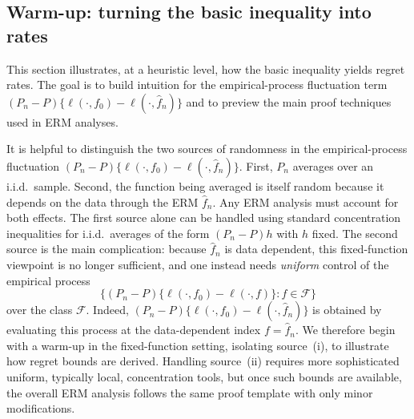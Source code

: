 \documentclass[11pt]{article}
\theoremstyle{plain}
\theoremstyle{definition} %
\begin{document}
\subsection{Warm-up: turning the basic inequality into rates}

This section illustrates, at a heuristic level, how the basic inequality yields
regret rates. The goal is to build intuition for the empirical-process
fluctuation term
\((P_n-P)\{\ell(\cdot,f_0)-\ell(\cdot,\hat f_n)\}\) and to preview the main
proof techniques used in ERM analyses.

It is helpful to distinguish the two sources of randomness in the empirical-process
fluctuation
\((P_n-P)\{\ell(\cdot,f_0)-\ell(\cdot,\hat f_n)\}\).
First, \(P_n\) averages over an i.i.d.\ sample. Second, the function being
averaged is itself random because it depends on the data through the ERM
\(\hat f_n\). Any ERM analysis must account for both effects. The first source
alone can be handled using standard concentration inequalities for i.i.d.\
averages of the form \((P_n-P)h\) with \(h\) fixed. The second source is the
main complication: because \(\hat f_n\) is data dependent, this fixed-function
viewpoint is no longer sufficient, and one instead needs \emph{uniform}
control of the empirical process
\[
\bigl\{(P_n-P)\{\ell(\cdot,f_0)-\ell(\cdot,f)\} : f\in\mathcal F\bigr\}
\]
over the class \(\mathcal F\). Indeed,
\((P_n-P)\{\ell(\cdot,f_0)-\ell(\cdot,\hat f_n)\}\) is obtained by evaluating
this process at the data-dependent index \(f=\hat f_n\). We therefore begin
with a warm-up in the fixed-function setting, isolating source~(i), to
illustrate how regret bounds are derived. Handling source~(ii) requires more
sophisticated uniform, typically local, concentration tools, but once such
bounds are available, the overall ERM analysis follows the same proof template
with only minor modifications.
\end{document}
